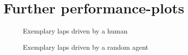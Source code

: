 

\chapter{Further performance-plots}


\label{AppendixE}


\begin{figure}[h]
	{%
		\setlength{\fboxsep}{0pt}%
		\setlength{\fboxrule}{1pt}%
	}%
	\centering
	\caption{Exemplary laps driven by a human}
	\label{fig:humandrive}
\end{figure}

\begin{figure}[h]
	{%
		\setlength{\fboxsep}{0pt}%
		\setlength{\fboxrule}{1pt}%
	}%
	\centering
	\caption{Exemplary laps driven by a random agent}
	\label{fig:randomdrive}
\end{figure}